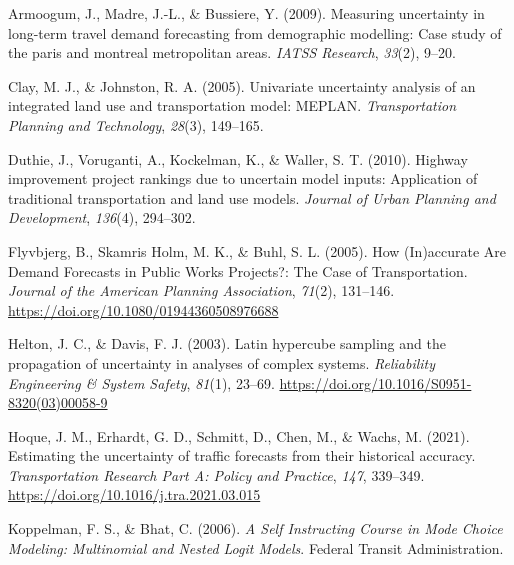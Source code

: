\documentclass[fancy, masters,twoside]{byuthesis}
\newlength{\cslhangindent}
\newlength{\cslentryspacingunit} %
\newenvironment{CSLReferences}[2] %
 {%
  \setlength{\parindent}{0pt}
  \ifodd #1
  \let\oldpar\par
  \def\par{\hangindent=\cslhangindent\oldpar}
  \fi
  \setlength{\parskip}{#2\cslentryspacingunit}
 }%
 {}
\begin{document}
\pagestyle{myrefs}

\hypertarget{refs}{}
\begin{CSLReferences}{1}{0}
\leavevmode{}%
Armoogum, J., Madre, J.-L., \& Bussiere, Y. (2009). Measuring uncertainty in long-term travel demand forecasting from demographic modelling: Case study of the paris and montreal metropolitan areas. \emph{IATSS Research}, \emph{33}(2), 9--20.

\leavevmode{}%
Clay, M. J., \& Johnston, R. A. (2005). Univariate uncertainty analysis of an integrated land use and transportation model: MEPLAN. \emph{Transportation Planning and Technology}, \emph{28}(3), 149--165.

\leavevmode{}%
Duthie, J., Voruganti, A., Kockelman, K., \& Waller, S. T. (2010). Highway improvement project rankings due to uncertain model inputs: Application of traditional transportation and land use models. \emph{Journal of Urban Planning and Development}, \emph{136}(4), 294--302.

\leavevmode{}%
Flyvbjerg, B., Skamris Holm, M. K., \& Buhl, S. L. (2005). How ({In})accurate {Are Demand Forecasts} in {Public Works Projects}?: {The Case} of {Transportation}. \emph{Journal of the American Planning Association}, \emph{71}(2), 131--146. \url{https://doi.org/10.1080/01944360508976688}

\leavevmode{}%
Helton, J. C., \& Davis, F. J. (2003). Latin hypercube sampling and the propagation of uncertainty in analyses of complex systems. \emph{Reliability Engineering \& System Safety}, \emph{81}(1), 23--69. \url{https://doi.org/10.1016/S0951-8320(03)00058-9}

\leavevmode{}%
Hoque, J. M., Erhardt, G. D., Schmitt, D., Chen, M., \& Wachs, M. (2021). Estimating the uncertainty of traffic forecasts from their historical accuracy. \emph{Transportation Research Part A: Policy and Practice}, \emph{147}, 339--349. \url{https://doi.org/10.1016/j.tra.2021.03.015}

\leavevmode{}%
Koppelman, F. S., \& Bhat, C. (2006). \emph{A {Self Instructing Course} in {Mode Choice Modeling}: {Multinomial} and {Nested Logit Models}}. {Federal Transit Administration}.


\end{CSLReferences}
\end{document}
